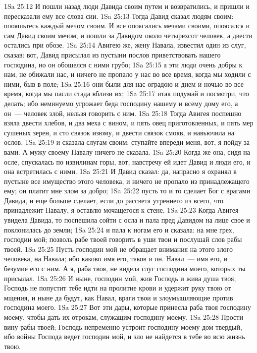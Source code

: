 \vs 1Sa 25:12 И пошли назад люди Давида своим путем и возвратились, и пришли и пересказали ему все слова сии.
\vs 1Sa 25:13 Тогда Давид сказал людям своим: опояшьтесь каждый мечом своим. И все опоясались мечами своими, опоясался и сам Давид своим мечом, и пошли за Давидом около четырехсот человек, а двести остались при обозе.
\vs 1Sa 25:14 Авигею же, жену Навала, известил один из слуг, сказав: вот, Давид присылал из пустыни послов приветствовать нашего господина, но он обошелся с ними грубо;
\vs 1Sa 25:15 а эти люди очень добры к нам, не обижали нас, и ничего не пропало у нас во все время, когда мы ходили с ними, быв в поле;
\vs 1Sa 25:16 они были для нас оградою и днем и ночью во все время, когда мы пасли стада вблизи их;
\vs 1Sa 25:17 итак подумай и посмотри, что делать; ибо неминуемо угрожает беда господину нашему и всему дому его, а он~--- человек злой, нельзя говорить с ним.
\vs 1Sa 25:18 Тогда Авигея поспешно взяла двести хлебов, и два меха с вином, и пять овец приготовленных, и пять мер сушеных зерен, и сто связок изюму, и двести связок смокв, и навьючила на ослов,
\vs 1Sa 25:19 и сказала слугам своим: ступайте впереди меня, вот, я пойду за вами. А мужу своему Навалу ничего не сказала.
\vs 1Sa 25:20 Когда же она, сидя на осле, спускалась по извилинам горы, вот, навстречу ей идет Давид и люди его, и она встретилась с ними.
\vs 1Sa 25:21 И Давид сказал: да, напрасно я охранял в пустыне все имущество этого человека, и ничего не пропало из принадлежащего ему; он платит мне злом за добро;
\vs 1Sa 25:22 пусть то и то сделает Бог с врагами Давида, и еще больше сделает, если до рассвета утреннего из всего, что принадлежит Навалу, я оставлю мочащегося к стене.
\vs 1Sa 25:23 Когда Авигея увидела Давида, то поспешила сойти с осла и пала пред Давидом на лице свое и поклонилась до земли;
\vs 1Sa 25:24 и пала к ногам его и сказала: на мне грех, господин мой; позволь рабе твоей говорить в уши твои и послушай слов рабы твоей.
\vs 1Sa 25:25 Пусть господин мой не обращает внимания на этого злого человека, на Навала; ибо каково имя его, таков и он. Навал~--- имя его, и безумие его с ним. А я, раба твоя, не видела слуг господина моего, которых ты присылал.
\vs 1Sa 25:26 И ныне, господин мой, жив Господь и жива душа твоя, Господь не попустит тебе идти на пролитие крови и удержит руку твою от мщения, и ныне да будут, как Навал, враги твои и злоумышляющие против господина моего.
\vs 1Sa 25:27 Вот эти дары, которые принесла раба твоя господину моему, чтобы дать их отрокам, служащим господину моему.
\vs 1Sa 25:28 Прости вину рабы твоей; Господь непременно устроит господину моему дом твердый, ибо войны Господа ведет господин мой, и зло не найдется в тебе во всю жизнь твою.
